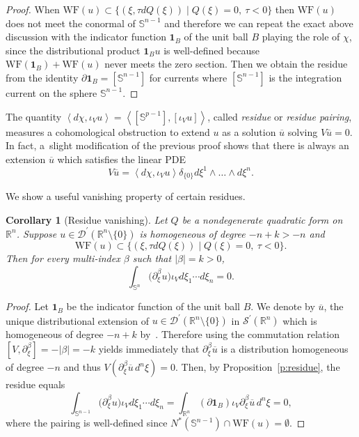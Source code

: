 \documentclass[10pt]{amsart}
\let\pazocal\mathscr
\newtheorem{corollary}[theorem]{Corollary}
\theoremstyle{definition}
\let\st\mid
\let\Feuler V
\let\exd u
\newcommand{\one}{\boldsymbol{1}}
\newcommand\wf{\mathrm{WF}}
\renewcommand{\boxed}[1]{#1}
\begin{document}
\begin{proof}
When $\wf(\exd)\subset \{(\xi,\tau dQ(\xi)) \st Q(\xi)=0, \ \tau<0\}$ then $\wf(\exd)$ does not meet the conormal of $\mathbb{S}^{n-1}$
and therefore we can repeat the exact above discussion with the indicator function $\one_B$ of the unit ball $B$ playing the role of $\chi$,
since the distributional product $\one_B \exd$ is well-defined because $\wf(\one_B)+ \wf(\exd)$ never meets the zero section.
Then we obtain the residue from the identity $\partial \one_B=[\mathbb{S}^{n-1}]$ for currents
where $[\mathbb{S}^{n-1}]$ is the integration current on the sphere $\mathbb{S}^{n-1}$.
\end{proof}

The quantity $\left\langle d\chi, \iota_\Feuler \exd \right\rangle=\left\langle [\mathbb{S}^{p-1}],[\iota_\Feuler \exd] \right\rangle$,
called \emph{residue} or \emph{residue pairing}, measures a cohomological obstruction to extend $\exd$ as a solution $\overline{\exd}$ solving $\Feuler \overline{\exd}=0$.
In fact, a~slight modification of the previous proof shows that there is always an
extension $\overline{\exd}$ which satisfies the linear PDE
\[
\boxed{\Feuler \overline{\exd}=\left\langle d\chi, \iota_\Feuler \exd \right\rangle \delta_{\{0\}} d\xi^1\wedge \dots\wedge d\xi^n.}
\]

We show a useful vanishing {property} of {certain} residues.

\begin{corollary}[{Residue vanishing}]\label{l:vanishing1}
Let $Q$ be a nondegenerate quadratic form on~$\mathbb{R}^n$.
Suppose $\exd\in \pazocal{D}^\prime(\mathbb{R}^n\setminus \{0\})$ is homogeneous of degree $-n+k>-n$ and
\[
\wf(\exd)\subset \{(\xi,\tau dQ(\xi)) \st Q(\xi)=0, \ \tau<0\}.
\]
Then for every
multi-index $\beta$ such that $\vert\beta\vert=k>0$,
\[
\int_{\mathbb{S}^n} \big(\partial_{\xi}^\beta \exd\big) \iota_\Feuler d\xi_1\cdots d\xi_n =0.
\]
\end{corollary}
\begin{proof}
Let $\one_B$ be the indicator function of the unit ball $B$. We denote by $\overline{\exd}$, the unique distributional extension of $\exd\in \pazocal{D}^\prime(\mathbb{R}^n\setminus \{0\})$ in $\pazocal{S}^\prime(\mathbb{R}^n)$ which is homogeneous of degree $-n+k$ by~\cite[Th.\,3.2.3, p.\,75]{H}.
Therefore using the commutation relation $[\Feuler,\partial_\xi^\beta]=-\vert\beta\vert=-k$ yields immediately
that $\partial_\xi^\beta \overline{\exd}$ is a distribution
homogeneous of degree $-n$ and thus $\Feuler(\partial_\xi^\beta \overline{\exd}\,d^n\xi)=0$.
Then, by Proposition~\ref{p:residue}, the residue equals
\[
\int_{\mathbb{S}^{n-1}} \big(\partial_{\xi}^\beta \exd\big) \iota_\Feuler d\xi_1\cdots d\xi_n=\int_{\mathbb{R}^n} \left(\partial \one_B\right) \iota_\Feuler \partial_\xi^\beta \overline{\exd}\,d^n\xi=0,
\]
where the pairing is well-defined since $N^*(\mathbb{S}^{n-1})\cap \wf(\exd)=\emptyset$.
\end{proof}
\end{document}
